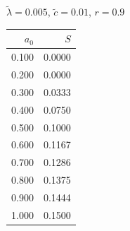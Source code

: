 \documentclass[11pt,a4paper,dvipsnames,twosided]{article}
\begin{document}
\begin{minipage}[t]{\textwidth}
\begin{minipage}[t]{0.32\textwidth}
        \footnotesize
        \begin{flushleft}$\tilde{\lambda}=0.005$, $\tilde{c}=0.01$, $r=0.9$\end{flushleft}
        \begin{tabular}[t]{rr}
            $a_0$ & $S$ \\
            \hline
             0.100 & 0.0000 \\
             0.200 & 0.0000 \\
             0.300 & 0.0333 \\
             0.400 & 0.0750 \\
             0.500 & 0.1000 \\
             0.600 & 0.1167 \\
             0.700 & 0.1286 \\
             0.800 & 0.1375 \\
             0.900 & 0.1444 \\
             1.000 & 0.1500 \\
        \end{tabular}
    \end{minipage}
\end{minipage}
\end{document}
